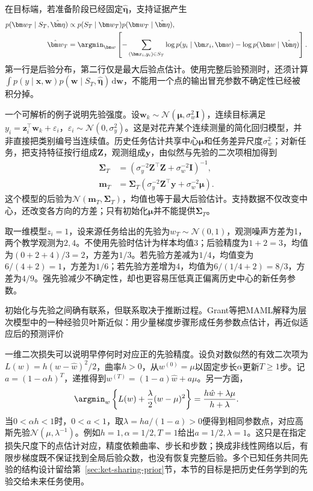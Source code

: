 在目标端，若准备阶段已经固定$\hat{\bm\eta}$，支持证据产生
\begin{align}
  p(\bm w_T\mid S_T,\hat{\bm\eta})
  &\propto p(S_T\mid\bm w_T)p(\bm w_T\mid\hat{\bm\eta}), \nonumber\\
  \hat{\bm w}_T
  &=\argmin_{\bm w}\left[
       -\sum_{(\bm x_i,y_i)\in S_T}\log p(y_i\mid\bm x_i,\bm w)
       -\log p(\bm w\mid\hat{\bm\eta})\right].
  \label{eq:ket-transfer-map}
\end{align}
第一行是后验分布，第二行仅是最大后验点估计。使用完整后验预测时，还须计算$\int p(y\mid\bm x,\bm w)p(\bm w\mid S_T,\hat{\bm\eta})\,\mathrm d\bm w$，不能用一个点的输出冒充参数不确定性已经被积分掉。

一个可解析的例子说明先验强度。设$\bm w_k\sim\mathcal N(\bm\mu,\sigma_w^2\bm I)$，连续目标满足$y_i=\bm z_i^\top\bm w_k+\varepsilon_i$，$\varepsilon_i\sim\mathcal N(0,\sigma_y^2)$。这是对花卉某个连续测量的简化回归模型，并非直接把类别编号当连续值。历史任务估计共享中心$\bm\mu$和任务差异尺度$\sigma_w^2$；对新任务，把支持特征按行组成$\bm Z$，观测组成$\bm y$，由似然与先验的二次项相加得到
\begin{align}
  \bm\Sigma_T
    &=\left(\sigma_y^{-2}\bm Z^\top\bm Z
                     +\sigma_w^{-2}\bm I\right)^{-1}, \nonumber\\
  \bm m_T
    &=\bm\Sigma_T\left(\sigma_y^{-2}\bm Z^\top\bm y
                     +\sigma_w^{-2}\bm\mu\right).
  \label{eq:ket-transfer-gaussian-posterior}
\end{align}
这个模型的后验为$\mathcal N(\bm m_T,\bm\Sigma_T)$，均值也等于最大后验估计。支持数据不仅改变中心，还改变各方向的方差；只有初始化$\bm\mu$并不能提供$\bm\Sigma_T$。

\begin{example}[先验怎样改变少样本估计]
  \label{ex:ket-transfer-prior-numeric}
  取一维模型$z_i=1$，设来源任务给出的先验为$w_T\sim\mathcal N(0,1)$，观测噪声方差为1，两个教学观测为$2,4$。不使用先验时估计为样本均值3；后验精度为$1+2=3$，均值为$(0+2+4)/3=2$，方差为$1/3$。若先验方差减为$1/4$，均值变为$6/(4+2)=1$，方差为$1/6$；若先验方差增为4，均值为$6/(1/4+2)=8/3$，方差为$4/9$。强先验减少不确定性，却也更容易压低真正偏离历史中心的新任务参数。
\end{example}

初始化与先验之间确有联系，但联系取决于推断过程。Grant等把MAML解释为层次模型中的一种经验贝叶斯近似：用少量梯度步骤形成任务参数点估计，再近似适应后的预测评价

一维二次损失可以说明早停何时对应正的先验精度。设负对数似然的有效二次项为$L(w)=h(w-\hat w)^2/2$，曲率$h>0$，从$w^{(0)}=\mu$以固定步长$\alpha$更新$T\geq1$步。记$a=(1-\alpha h)^T$，递推得到$w^{(T)}=(1-a)\hat w+a\mu$。另一方面，
\[
  \argmin_w\left\{L(w)+\frac{\lambda}{2}(w-\mu)^2\right\}
    =\frac{h\hat w+\lambda\mu}{h+\lambda}.
\]
当$0<\alpha h<1$时，$0<a<1$，取$\lambda=ha/(1-a)>0$便得到相同参数点，对应高斯先验$\mathcal N(\mu,\lambda^{-1})$。例如$h=1,\alpha=1/2,T=1$给出$a=1/2,\lambda=1$。这只是在指定损失尺度下的点估计对应，精度依赖曲率、步长和步数；换成非线性网络以后，有限步梯度既不保证找到全局后验众数，也没有恢复完整后验。多个已知任务共同先验的结构设计留给第~\ref{sec:ket-sharing-prior}节，本节的目标是把历史任务学到的先验交给未来任务使用。

